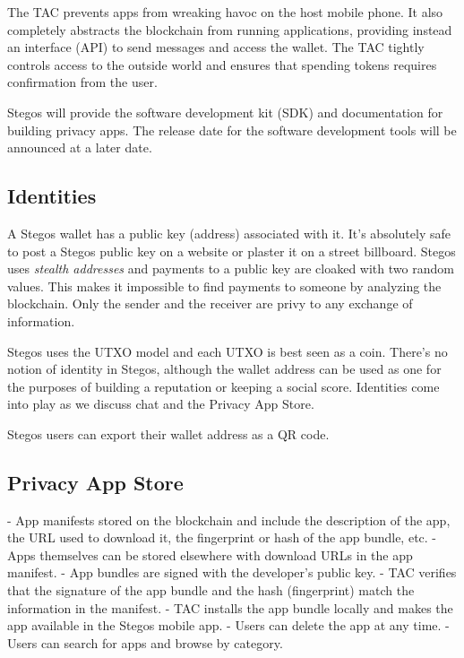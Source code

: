 \documentclass[a4paper, 10pt, conference]{ieeeconf}
\begin{document}
The TAC prevents apps from wreaking havoc on the host mobile phone. It also completely abstracts the blockchain from running applications, providing instead an interface (API) to send messages and access the wallet. The TAC tightly controls access to the outside world and ensures that spending tokens requires confirmation from the user. 

Stegos will provide the software development kit (SDK) and documentation for building privacy apps. The release date for the software development tools will be announced at a later date.

\subsection{Identities}\label{Identities}
A Stegos wallet has a public key (address) associated with it. It's absolutely safe to post a Stegos public key on a website or plaster it on a street billboard. Stegos uses \textit{stealth addresses} and payments to a public key are cloaked with two random values. This makes it impossible to find payments to someone by analyzing the blockchain. Only the sender and the receiver are privy to any exchange of information. 

Stegos uses the UTXO model and each UTXO is best seen as a coin. There's no notion of identity in Stegos, although the wallet address can be used as one for the purposes of building a reputation or keeping a social score. Identities come into play as we discuss chat and the Privacy App Store. 
 
Stegos users can export their wallet address as a QR code. 
 
\subsection{Privacy App Store}
 
- App manifests stored on the blockchain and include the description of the app, the URL used to download it, the fingerprint or hash of the app bundle, etc. 
- Apps themselves can be stored elsewhere with download URLs in the app manifest.
- App bundles are signed with the developer's public key.
- TAC verifies that the signature of the app bundle and the hash (fingerprint) match the information in the manifest.
- TAC installs the app bundle locally and makes the app available in the Stegos mobile app.
- Users can delete the app at any time.
- Users can search for apps and browse by category. 
\end{document}
